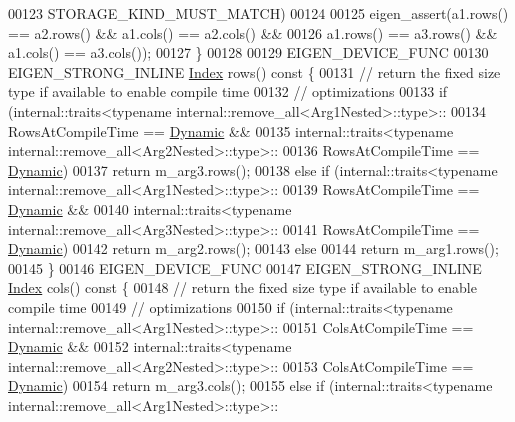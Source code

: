 \begin{DoxyCode}
00123                         STORAGE\_KIND\_MUST\_MATCH)
00124 
00125     eigen\_assert(a1.rows() == a2.rows() && a1.cols() == a2.cols() &&
00126                  a1.rows() == a3.rows() && a1.cols() == a3.cols());
00127   \}
00128 
00129   EIGEN\_DEVICE\_FUNC
00130   EIGEN\_STRONG\_INLINE \hyperlink{namespace_eigen_a62e77e0933482dafde8fe197d9a2cfde}{Index} rows()\textcolor{keyword}{ const }\{
00131     \textcolor{comment}{// return the fixed size type if available to enable compile time}
00132     \textcolor{comment}{// optimizations}
00133     \textcolor{keywordflow}{if} (internal::traits<\textcolor{keyword}{typename} internal::remove\_all<Arg1Nested>::type>::
00134                 RowsAtCompileTime == \hyperlink{namespace_eigen_ad81fa7195215a0ce30017dfac309f0b2}{Dynamic} &&
00135         internal::traits<\textcolor{keyword}{typename} internal::remove\_all<Arg2Nested>::type>::
00136                 RowsAtCompileTime == \hyperlink{namespace_eigen_ad81fa7195215a0ce30017dfac309f0b2}{Dynamic})
00137       \textcolor{keywordflow}{return} m\_arg3.rows();
00138     \textcolor{keywordflow}{else} \textcolor{keywordflow}{if} (internal::traits<\textcolor{keyword}{typename} internal::remove\_all<Arg1Nested>::type>::
00139                      RowsAtCompileTime == \hyperlink{namespace_eigen_ad81fa7195215a0ce30017dfac309f0b2}{Dynamic} &&
00140              internal::traits<\textcolor{keyword}{typename} internal::remove\_all<Arg3Nested>::type>::
00141                      RowsAtCompileTime == \hyperlink{namespace_eigen_ad81fa7195215a0ce30017dfac309f0b2}{Dynamic})
00142       \textcolor{keywordflow}{return} m\_arg2.rows();
00143     \textcolor{keywordflow}{else}
00144       \textcolor{keywordflow}{return} m\_arg1.rows();
00145   \}
00146   EIGEN\_DEVICE\_FUNC
00147   EIGEN\_STRONG\_INLINE \hyperlink{namespace_eigen_a62e77e0933482dafde8fe197d9a2cfde}{Index} cols()\textcolor{keyword}{ const }\{
00148     \textcolor{comment}{// return the fixed size type if available to enable compile time}
00149     \textcolor{comment}{// optimizations}
00150     \textcolor{keywordflow}{if} (internal::traits<\textcolor{keyword}{typename} internal::remove\_all<Arg1Nested>::type>::
00151                 ColsAtCompileTime == \hyperlink{namespace_eigen_ad81fa7195215a0ce30017dfac309f0b2}{Dynamic} &&
00152         internal::traits<\textcolor{keyword}{typename} internal::remove\_all<Arg2Nested>::type>::
00153                 ColsAtCompileTime == \hyperlink{namespace_eigen_ad81fa7195215a0ce30017dfac309f0b2}{Dynamic})
00154       \textcolor{keywordflow}{return} m\_arg3.cols();
00155     \textcolor{keywordflow}{else} \textcolor{keywordflow}{if} (internal::traits<\textcolor{keyword}{typename} internal::remove\_all<Arg1Nested>::type>::

\end{DoxyCode}
